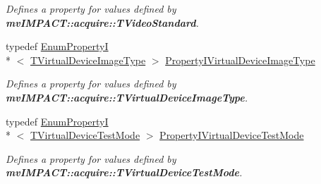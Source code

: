 \begin{DoxyCompactItemize}
\begin{DoxyCompactList}\small\item\em Defines a property for values defined by {\bfseries mv\+I\+M\+P\+A\+C\+T\+::acquire\+::\+T\+Video\+Standard}. \end{DoxyCompactList}\item 
\hypertarget{group___device_specific_interface_gacfecce2b643c06f4a31fbced42789247}{typedef \hyperlink{classmv_i_m_p_a_c_t_1_1acquire_1_1_enum_property_i}{Enum\+Property\+I}\\*
$<$ \hyperlink{group___device_specific_interface_ga5b29826e8e9b1e0b25124f77ac6ff6e5}{T\+Virtual\+Device\+Image\+Type} $>$ \hyperlink{group___device_specific_interface_gacfecce2b643c06f4a31fbced42789247}{Property\+I\+Virtual\+Device\+Image\+Type}}\label{group___device_specific_interface_gacfecce2b643c06f4a31fbced42789247}

\begin{DoxyCompactList}\small\item\em Defines a property for values defined by {\bfseries mv\+I\+M\+P\+A\+C\+T\+::acquire\+::\+T\+Virtual\+Device\+Image\+Type}. \end{DoxyCompactList}\item 
\hypertarget{group___device_specific_interface_ga3e8eeaeee6e265c687f5f1bcc8f086a6}{typedef \hyperlink{classmv_i_m_p_a_c_t_1_1acquire_1_1_enum_property_i}{Enum\+Property\+I}\\*
$<$ \hyperlink{group___device_specific_interface_ga7d26416f3dfdd24d6331fcf6bfd32a38}{T\+Virtual\+Device\+Test\+Mode} $>$ \hyperlink{group___device_specific_interface_ga3e8eeaeee6e265c687f5f1bcc8f086a6}{Property\+I\+Virtual\+Device\+Test\+Mode}}\label{group___device_specific_interface_ga3e8eeaeee6e265c687f5f1bcc8f086a6}

\begin{DoxyCompactList}\small\item\em Defines a property for values defined by {\bfseries mv\+I\+M\+P\+A\+C\+T\+::acquire\+::\+T\+Virtual\+Device\+Test\+Mode}. \end{DoxyCompactList}\end{DoxyCompactItemize}
